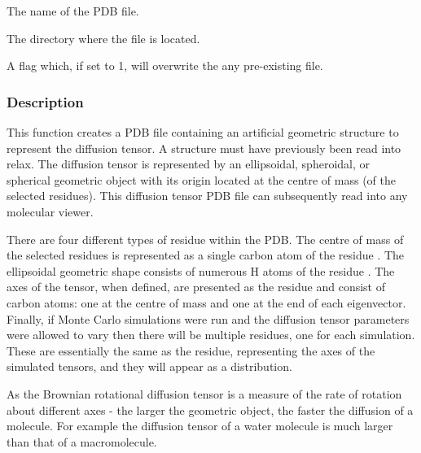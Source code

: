    The name of the PDB file.   

   The directory where the file is located.   

   A flag which, if set to 1, will overwrite the any pre-existing file.  

  

  
 \subsubsection{Description} 

 This function creates a PDB file containing an artificial geometric structure to represent the diffusion tensor.  A structure must have previously been read into relax.  The diffusion tensor is represented by an ellipsoidal, spheroidal, or spherical geometric object with its origin located at the centre of mass (of the selected residues).  This diffusion tensor PDB file can subsequently read into any molecular viewer. 
  

 There are four different types of residue within the PDB.  The centre of mass of the selected residues is represented as a single carbon atom of the residue .  The ellipsoidal geometric shape consists of numerous H atoms of the residue .  The axes of the tensor, when defined, are presented as the residue  and consist of carbon atoms: one at the centre of mass and one at the end of each eigenvector.  Finally, if Monte Carlo simulations were run and the diffusion tensor parameters were allowed to vary then there will be multiple  residues, one for each simulation.  These are essentially the same as the  residue, representing the axes of the simulated tensors, and they will appear as a distribution. 
  

 As the Brownian rotational diffusion tensor is a measure of the rate of rotation about different axes - the larger the geometric object, the faster the diffusion of a molecule. For example the diffusion tensor of a water molecule is much larger than that of a macromolecule. 
  

